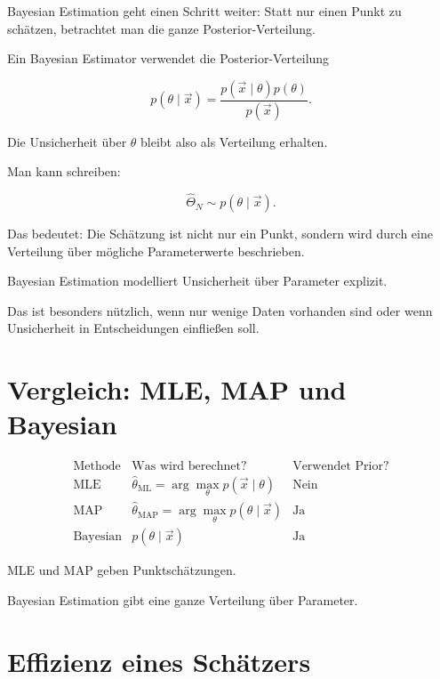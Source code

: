 Bayesian Estimation geht einen Schritt weiter:
Statt nur einen Punkt zu schätzen, betrachtet man die ganze Posterior-Verteilung.

\begin{definitionbox}
Ein Bayesian Estimator verwendet die Posterior-Verteilung

\[
    p(\theta \mid \vec{x})
    =
    \frac{
        p(\vec{x}\mid\theta)p(\theta)
    }{
        p(\vec{x})
    }.
\]

Die Unsicherheit über \(\theta\) bleibt also als Verteilung erhalten.
\end{definitionbox}

Man kann schreiben:

\[
    \hat{\Theta}_N
    \sim
    p(\theta \mid \vec{x}).
\]

Das bedeutet:
Die Schätzung ist nicht nur ein Punkt, sondern wird durch eine Verteilung über mögliche Parameterwerte beschrieben.

\begin{conceptbox}
Bayesian Estimation modelliert Unsicherheit über Parameter explizit.

Das ist besonders nützlich, wenn nur wenige Daten vorhanden sind oder wenn Unsicherheit in Entscheidungen einfließen soll.
\end{conceptbox}

\section{Vergleich: MLE, MAP und Bayesian}

\[
\begin{array}{c|c|c}
\text{Methode}
&
\text{Was wird berechnet?}
&
\text{Verwendet Prior?}
\\
\hline
\text{MLE}
&
\hat{\theta}_{\mathrm{ML}}
=
\arg\max_{\theta}p(\vec{x}\mid\theta)
&
\text{Nein}
\\
\hline
\text{MAP}
&
\hat{\theta}_{\mathrm{MAP}}
=
\arg\max_{\theta}p(\theta\mid\vec{x})
&
\text{Ja}
\\
\hline
\text{Bayesian}
&
p(\theta\mid\vec{x})
&
\text{Ja}
\end{array}
\]

\begin{notebox}
MLE und MAP geben Punktschätzungen.

Bayesian Estimation gibt eine ganze Verteilung über Parameter.
\end{notebox}

\section{Effizienz eines Schätzers}

